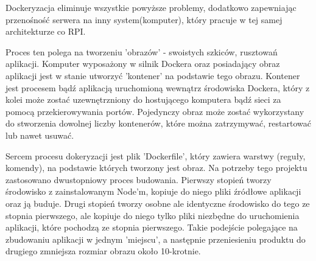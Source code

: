 Dockeryzacja eliminuje wszystkie powyższe problemy, dodatkowo zapewniając przenośność serwera na inny system(komputer), który pracuje w tej samej architekturze co RPI.

Proces ten polega na tworzeniu 'obrazów' - swoistych szkiców, rusztowań aplikacji. Komputer wyposażony w silnik Dockera oraz posiadający obraz aplikacji jest w stanie 
utworzyć 'kontener' na podstawie tego obrazu. Kontener jest procesem bądź aplikacją uruchomioną wewnątrz środowiska Dockera, który z kolei może zostać uzewnętrzniony do 
hostującego komputera bądź sieci za pomocą przekierowywania portów. Pojedynczy obraz może zostać wykorzystany do stworzenia dowolnej liczby kontenerów, które
można zatrzymywać, restartować lub nawet usuwać.

Sercem procesu dokeryzacji jest plik 'Dockerfile', który zawiera warstwy (reguły, komendy), na podstawie których tworzony jest obraz. Na potrzeby tego projektu zastosowano
dwustopniowy proces budowania. Pierwszy stopień tworzy środowisko z zainstalowanym Node'm, kopiuje do niego pliki źródłowe aplikacji oraz ją buduje. Drugi stopień tworzy osobne
ale identyczne środowisko do tego ze stopnia pierwszego, ale kopiuje do niego tylko pliki niezbędne do uruchomienia aplikacji, które pochodzą ze stopnia pierwszego. 
Takie podejście polegające na zbudowaniu aplikacji w jednym 'miejscu', a następnie przeniesieniu produktu do drugiego zmniejsza rozmiar obrazu około 10-krotnie.

